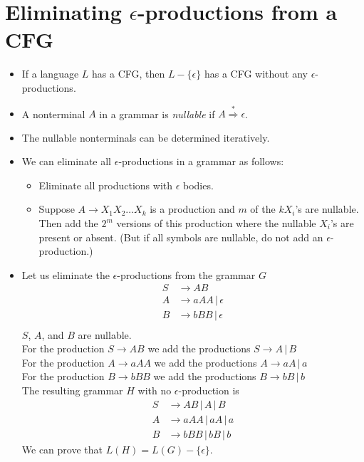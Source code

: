 \documentclass[]{article}
\begin{document}
\section{Eliminating $\epsilon$-productions from a CFG}
  \begin{itemize}
    \item If a language $L$ has a CFG, then $L - \{\epsilon\}$ has a CFG without 
    any $\epsilon$-productions.
    \item A nonterminal $A$ in a grammar is \emph{nullable} if $A \overset{*}
    {\Rightarrow} \epsilon$.
    \item The nullable nonterminals can be determined iteratively.
    \item We can eliminate all $\epsilon$-productions in a grammar as follows:
      \begin{itemize}
        \item Eliminate all productions with $\epsilon$ bodies.
        \item Suppose $A \rightarrow X_1X_2\ldots{}X_k$ is a production and $m$ of 
        the $kX_i$'s are nullable. Then add the $2^m$ versions of this production 
        where the nullable $X_i$'s are present or absent. (But if all symbols are 
        nullable, do not add an $\epsilon$-production.)
      \end{itemize}
    \item Let us eliminate the $\epsilon$-productions from the grammar $G$
      \begin{align*}
        S &\rightarrow AB \\
        A &\rightarrow aAA \, | \, \epsilon \\
        B &\rightarrow bBB \, | \, \epsilon \\
      \end{align*}
    $S$, $A$, and $B$ are nullable. \\
    For the production $S\rightarrow{AB}$ we add the productions $S\rightarrow{A} 
    \, | \, B$ \\
    For the production $A\rightarrow{aAA}$ we add the productions $A
    \rightarrow{aA} \, | \, a$ \\
    For the production $B\rightarrow{bBB}$ we add the productions $B
    \rightarrow{bB} \, | \, b$ \\
    The resulting grammar $H$ with no $\epsilon$-production is
      \begin{align*}
        S &\rightarrow AB  \, | \,  A \, | \, B \\
        A &\rightarrow aAA \, | \, aA \, | \, a \\
        B &\rightarrow bBB \, | \, bB \, | \, b
      \end{align*}
    We can prove that $L(H) = L(G) - \{\epsilon\}$.
  \end{itemize}
\end{document}
